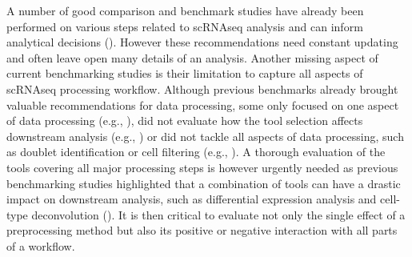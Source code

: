 \documentclass{bmcart}
\begin{document}
A number of good comparison and benchmark studies have already been performed on various steps related to scRNAseq analysis and can inform analytical decisions (\citealp{CobosDeconvolution2020, colePerformance2018, DalMolinDE2017, duoClustering2018, freytagComparison2018, HeiserDimred2019, JaakkolaDE2017, SonesonDE2018, SunDimRed2019, tianMixology2018, TranBatch2020, TsuyuzakiPCA2020, viethSystematic2019, WangDE2019, YipHVGs2018, ZhangImput2018}). However these recommendations need constant updating and often leave open many details of an analysis. Another missing aspect of current benchmarking studies is their limitation to capture all aspects of scRNAseq processing workflow. Although previous benchmarks already brought valuable recommendations for data processing, some only focused on one aspect of data processing (e.g., \citealp{SunDimRed2019}), did not evaluate how the tool selection affects downstream analysis (e.g., \citealp{TsuyuzakiPCA2020}) or did not tackle all aspects of data processing, such as doublet identification or cell filtering (e.g., \citealp{viethSystematic2019}). A thorough evaluation of the tools covering all major processing steps is however urgently needed as previous benchmarking studies highlighted that a combination of tools can have a drastic impact on downstream analysis, such as differential expression analysis and cell-type deconvolution (\citealp{viethSystematic2019, CobosDeconvolution2020}). It is then critical to evaluate not only the single effect of a preprocessing method but also its positive or negative interaction with all parts of a workflow. 
\end{document}
